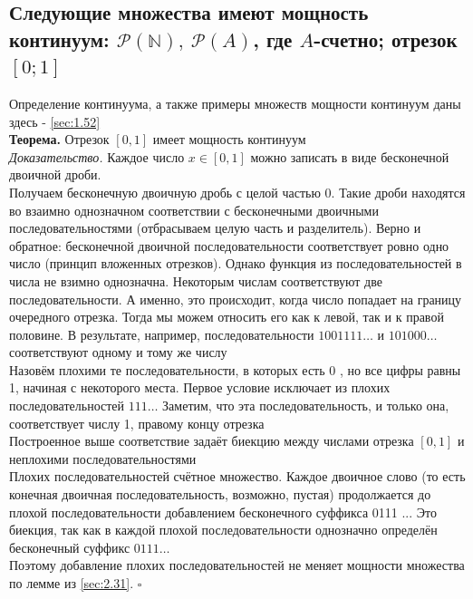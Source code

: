 \documentclass[a4paper]{article}
\newcommand{\qed}{\hfill$\square$}
\begin{document}
\subsection{Следующие множества имеют мощность континуум: $\mathcal{P}(\mathbb{N}),\ \mathcal{P}(A)$, где $A$-счетно; отрезок $[0;1]$}
Определение континуума, а также примеры множеств мощности континуум даны здесь - \ref{sec:1.52}\\[2mm]
\textbf{Теорема.} Отрезок $[0,1]$ имеет мощность континуум\\[2mm]
\textit{Доказательство.} Каждое число $x \in[0,1]$ можно записать в виде бесконечной двоичной дроби.\\[2mm]
\indent Получаем бесконечную двоичную дробь с целой частью 0. Такие дроби находятся во взаимно однозначном соответствии с бесконечными двоичными последовательностями (отбрасываем целую часть и разделитель). Верно и обратное: бесконечной двоичной последовательности соответствует ровно одно число (принцип вложенных отрезков). Однако функция из последовательностей в числа не взимно однозначна. Некоторым числам соответствуют две последовательности. А именно, это происходит, когда число попадает на границу очередного отрезка. Тогда мы можем относить его как к левой, так и к правой половине. В результате, например, последовательности $1001111 \ldots$ и $101000 \ldots$ соответствуют одному и тому же числу\\[2mm]
\indent Назовём плохими те последовательности, в которых есть 0 , но все цифры равны 1, начиная с некоторого места. Первое условие исключает из плохих последовательностей $111 \ldots$ Заметим, что эта последовательность, и только она, соответствует числу 1, правому концу отрезка\\[2mm]
\indent Построенное выше соответствие задаёт биекцию между числами отрезка $[0,1]$ и неплохими последовательностями\\[2mm]
\indent Плохих последовательностей счётное множество. Каждое двоичное слово (то есть конечная двоичная последовательность, возможно, пустая) продолжается до плохой последовательности добавлением бесконечного суффикса 0111 ... Это биекция, так как в каждой плохой последовательности однозначно определён бесконечный суффикс $0111 \ldots$\\[2mm]
\indent Поэтому добавление плохих последовательностей не меняет мощности множества по лемме из \ref{sec:2.31}. \qed
\end{document}
